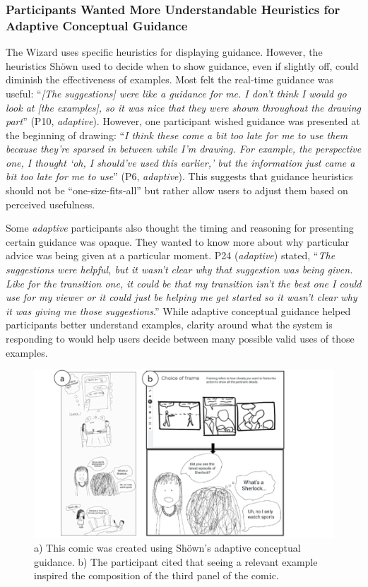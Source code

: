 \subsubsection{Participants Wanted More Understandable Heuristics for Adaptive Conceptual Guidance}
The Wizard uses specific heuristics for displaying guidance. However, the heuristics Sh{\"o}wn used to decide when to show guidance, even if slightly off, could diminish the effectiveness of examples. Most felt the real-time guidance was useful: ``\textit{[The suggestions] were like a guidance for me. I don’t think I would go look at [the examples], so it was nice that they were shown throughout the drawing part}'' (P10, \textit{adaptive}). 
However, one participant wished guidance was presented at the beginning of drawing: ``\textit{I think these come a bit too late for me to use them because they're sparsed in between while I'm drawing. For example, the perspective one, I thought `oh, I should've used this earlier,' but the information just came a bit too late for me to use}'' (P6, \textit{adaptive}). 
This suggests that guidance heuristics should not be ``one-size-fits-all'' but rather allow users to adjust them based on perceived usefulness.

Some \textit{adaptive} participants also thought the timing and reasoning for presenting certain guidance was opaque. 
They wanted to know more about why particular advice was being given at a particular moment. P24 (\textit{adaptive}) stated, ``\textit{The suggestions were helpful, but it wasn't clear why that suggestion was being given. Like for the transition one, it could be that my transition isn't the best one I could use for my viewer or it could just be helping me get started so it wasn't clear why it was giving me those suggestions}.''
While adaptive conceptual guidance helped participants better understand examples, clarity around what the system is responding to would help users decide between many possible valid uses of those examples.

\begin{figure}[b!]
  \includegraphics[width=\textwidth]{shown/figures/p16.png}
  \caption{a) This comic was created using Sh{\"o}wn's adaptive conceptual guidance. b) The participant cited that seeing a relevant example inspired the composition of the third panel of the comic.}
  \label{fig:p16}
\end{figure}

